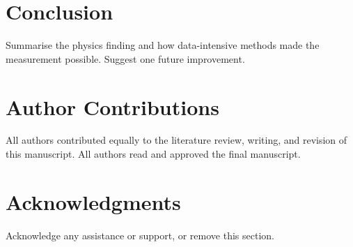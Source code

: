 \documentclass{iopconfser}
\begin{document}
\section{Conclusion}
Summarise the physics finding and how data-intensive methods
made the measurement possible. Suggest one future improvement.

\section*{Author Contributions}
All authors contributed equally to the literature review,
writing, and revision of this manuscript.
All authors read and approved the final manuscript.

\section*{Acknowledgments}
Acknowledge any assistance or support, or remove this section.



\end{document}
